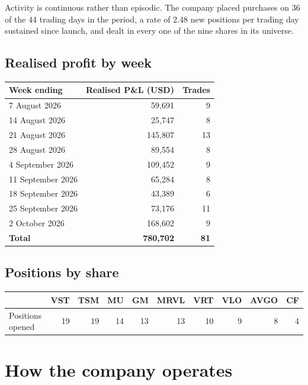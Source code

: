 \documentclass[11pt]{article}
\begin{document}
Activity is continuous rather than episodic. The company placed purchases on 36 of the 44
trading days in the period, a rate of 2.48 new positions per trading day sustained since launch,
and dealt in every one of the nine shares in its universe.

\subsection{Realised profit by week}

\begin{center}
\footnotesize
\begin{tabular}{@{}l r r@{}}
\toprule
\textbf{Week ending} & \textbf{Realised P\&L (USD)} & \textbf{Trades} \\
\midrule
7 August 2026    &  59,691 &  9 \\
14 August 2026   &  25,747 &  8 \\
21 August 2026   & 145,807 & 13 \\
28 August 2026   &  89,554 &  8 \\
4 September 2026 & 109,452 &  9 \\
11 September 2026 &  65,284 &  8 \\
18 September 2026 &  43,389 &  6 \\
25 September 2026 &  73,176 & 11 \\
2 October 2026    & 168,602 &  9 \\
\midrule
\textbf{Total}    & \textbf{780,702} & \textbf{81} \\
\bottomrule
\end{tabular}
\end{center}

\subsection{Positions by share}

\begin{center}
\footnotesize
\begin{tabular}{@{}l r r r r r r r r r@{}}
\toprule
& VST & TSM & MU & GM & MRVL & VRT & VLO & AVGO & CF \\
\midrule
Positions opened & 19 & 19 & 14 & 13 & 13 & 10 & 9 & 8 & 4 \\
\bottomrule
\end{tabular}
\end{center}

\section{How the company operates}
\end{document}

